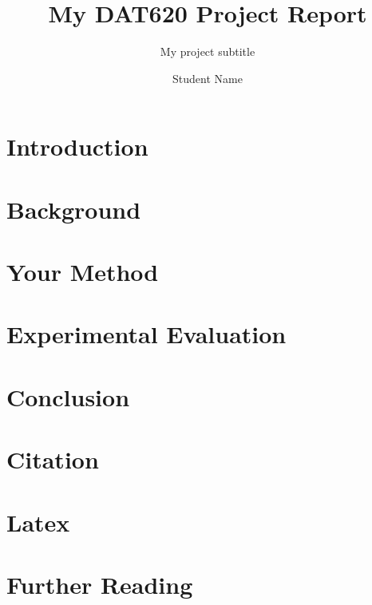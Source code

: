 \documentclass[sigconf]{acmart}
\begin{document}
\title{My DAT620 Project Report}
\subtitle{My project subtitle}

\author{Student Name}




\begin{abstract}

\end{abstract}


\maketitle


\section{Introduction}
\label{sec:introduction}


\section{Background}
\label{sec:background}


\section{Your Method}
\label{sec:method}


\section{Experimental Evaluation}
\label{sec:evaluation}


\section{Conclusion}
\label {sec:conclusion}


\section{Citation}
\label{sec:citation}



\section{Latex}
\label{sec:latex} 


\section{Further Reading}
\label{sec:further}




\end{document}
